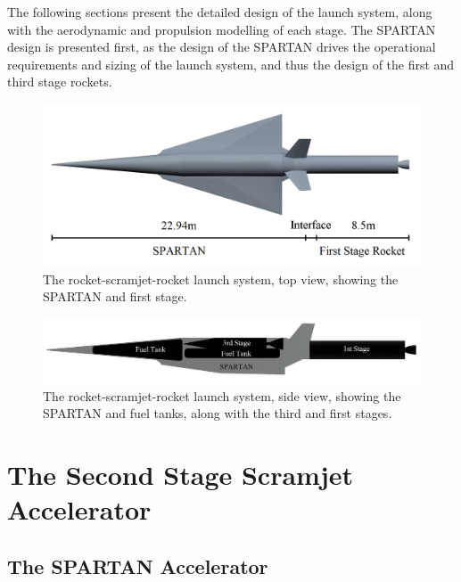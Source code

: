  The following sections present the detailed design of the launch system, along with the aerodynamic and propulsion modelling of each stage.
The SPARTAN design is presented first, as the design of the SPARTAN drives the operational requirements and sizing of the launch system, and thus the design of the first and third stage rockets. 


\begin{figure}[ht]
	\centering
	\includegraphics[width=0.7\linewidth]{figures/3_vehicle_design/NoInternal}
	\caption{The rocket-scramjet-rocket launch system, top view, showing the SPARTAN and first stage. }
	\label{fig:NoInternal}
\end{figure}

\begin{figure}[ht]
	\centering
	\includegraphics[width=0.7\linewidth]{figures/3_vehicle_design/INTERNALS}
	\caption{The rocket-scramjet-rocket launch system, side view, showing the SPARTAN and fuel tanks, along with the third and first stages.}
	\label{fig:INTERNALS}
\end{figure}









	
	
	\section{The Second Stage Scramjet Accelerator}\label{sec:SPARTAN}

	
		\subsection{The SPARTAN Accelerator}
		
